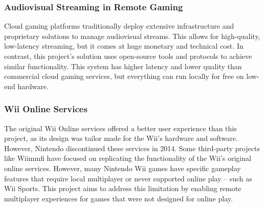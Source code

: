 \subsubsection{Audiovisual Streaming in Remote Gaming}
Cloud gaming platforms traditionally deploy extensive infrastructure and
proprietary solutions to manage audiovisual streams. This allows for
high-quality, low-latency streaming, but it comes at huge monetary and technical
cost\cite{cloudSurvey}.
In contrast, this project's solution uses open-source tools and
protocols to achieve similar functionality. This system has higher latency and lower quality than
commercial cloud gaming services, but everything can run locally for free on low-end hardware.

\subsubsection{Wii Online Services}
The original Wii Online services offered a better user experience than this
project, as its design was tailor made for the Wii's hardware and software.
However, Nintendo discontinued these services in
2014\cite{nintendoTerminationNintendo}. Some third-party projects like Wiimmfi\cite{wiimmfi}
have focused on replicating the functionality of the Wii’s original online
services. However, many Nintendo Wii games have specific gameplay features that
require local multiplayer or never supported online play -- such as Wii Sports.
This project aims to address this limitation by enabling remote multiplayer
experiences for games that were not designed for online play.
